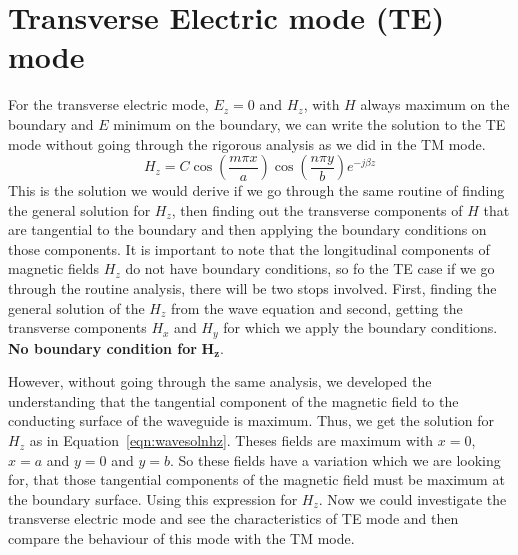 \section{Transverse Electric mode (TE) mode}
For the transverse electric mode, $E_{z} = 0$ and $H_{z}$, with $H$ always maximum on the boundary and $E$ minimum on the boundary, we can write the solution to the TE mode without going through the rigorous analysis as we did in the TM mode.
\begin{equation}
H_z = C\cos\left(\frac{m\pi x}{a}\right) \cos\left(\frac{n\pi y}{b}\right)e^{-j\beta z}
\label{eqn:wavesolnhz}
\end{equation}
This is the solution we would derive if we go through the same routine of finding the general solution for $H_z$, then finding out the transverse components of $H$ that are tangential to the boundary and then applying the boundary conditions on those components. It is important to note that the longitudinal components of magnetic fields $H_z$ do not have boundary conditions, so fo the TE case if we go through the routine analysis, there will be two stops involved. First, finding the general solution of the $H_z$ from the wave equation and second, getting the transverse components $H_x$ and $H_y$ for which we apply the boundary conditions. \textbf{No boundary condition for} $\boldsymbol{H_z}$.

However, without going through the same analysis, we developed the understanding that the tangential component of the magnetic field to the conducting surface of the waveguide is maximum. Thus, we get the solution for $H_z$ as in Equation~\eqref{eqn:wavesolnhz}. Theses fields are maximum with $x=0$, $x=a$ and $y=0$ and $y=b$. So these fields have a variation which we are looking for, that those tangential components of the magnetic field must be maximum at the boundary surface. Using this expression for $H_z$. Now we could investigate the transverse electric mode and see the characteristics of TE mode and then compare the behaviour of this mode with the TM mode.


